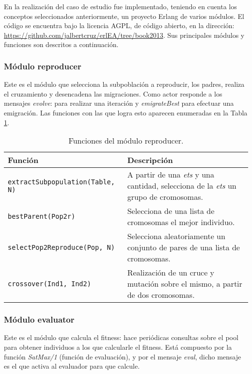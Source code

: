 En la realización del caso de estudio fue implementado, teniendo en cuenta los conceptos seleccionados anteriormente, un proyecto Erlang de varios módulos. El código se encuentra bajo la licencia AGPL, de código abierto, en la dirección: \url{https://github.com/jalbertcruz/erlEA/tree/book2013}. Sus principales módulos y funciones son descritos a continuación.


\subsubsection{Módulo reproducer}

Este es el módulo que selecciona la subpoblación a reproducir, los padres, realiza el cruzamiento y desencadena las migraciones. Como actor responde a los mensajes {\em evolve}: para realizar una iteración y {\em emigrateBest} para efectuar una emigración. Las funciones con las que logra esto aparecen enumeradas en la Tabla \ref{tb:reproducer}.

\begin{table}
  \caption{Funciones del módulo reproducer.}\label{tb:reproducer}
  \centering
\begin{tabular}{|p{5cm}|p{7cm}|}
  \hline
   \textbf{Función} &  \textbf{Descripción} \\
  \hline
  {\tt extractSubpopulation(Table, N) } & A partir de una {\em ets} y una cantidad, selecciona de la {\em ets} un grupo de cromosomas. \\
  \hline
  {\tt bestParent(Pop2r)} & Selecciona de una lista de cromosomas el mejor individuo. \\
  \hline
 {\tt selectPop2Reproduce(Pop, N)} & Selecciona aleatoriamente un conjunto de pares de una lista de cromosomas. \\
  \hline
  {\tt crossover(Ind1, Ind2)} & Realización de un cruce y mutación sobre el mismo, a partir de dos cromosomas. \\
  \hline
\end{tabular}
\end{table}


\subsubsection{Módulo evaluator}

Este es el módulo que calcula el fitness: hace periódicas consultas sobre el pool para obtener individuos a los que calcularle el fitness. Está compuesto por la función {\em SatMax/1} (función de evaluación), y por el mensaje {\em eval}, dicho mensaje es el que activa al evaluador para que calcule.

